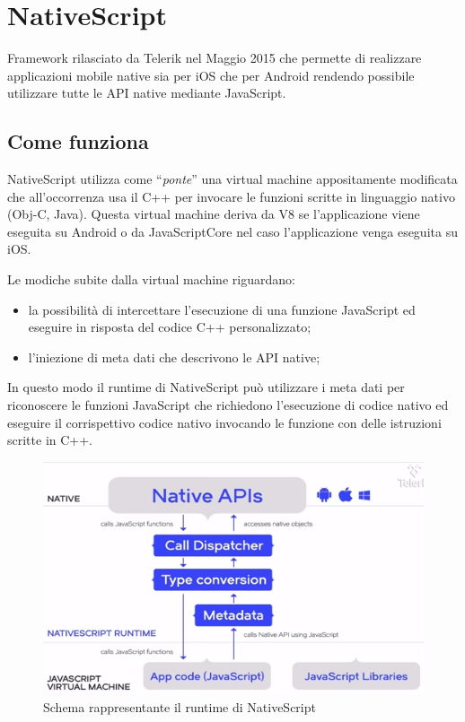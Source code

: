 \FloatBarrier
\section{NativeScript}

Framework rilasciato da Telerik nel Maggio 2015 che permette di realizzare applicazioni mobile native sia per iOS che per Android rendendo possibile utilizzare tutte le API native mediante JavaScript.

\subsection{Come funziona}

NativeScript utilizza come ``\textit{ponte}'' una virtual machine appositamente modificata che all'occorrenza usa il C++ per invocare le funzioni scritte in linguaggio nativo (Obj-C, Java).
Questa virtual machine deriva da V8 se l'applicazione viene eseguita su Android o da JavaScriptCore nel caso l'applicazione venga eseguita su iOS.

Le modiche subite dalla virtual machine riguardano:
\begin{itemize}
\item la possibilità di intercettare l'esecuzione di una funzione JavaScript ed eseguire in risposta del codice C++ personalizzato;
\item l'iniezione di meta dati che descrivono le API native;
\end{itemize} 
In questo modo il runtime di NativeScript può utilizzare i meta dati per riconoscere le funzioni JavaScript che richiedono l'esecuzione di codice nativo ed eseguire il corrispettivo codice nativo invocando le funzione con delle istruzioni scritte in C++.

\begin{figure}[htp]
\centering
\includegraphics[width=\textwidth*3/4]{../immagini/ns-runtime}
\caption{Schema rappresentante il runtime di NativeScript}  
\end{figure}
\FloatBarrier

